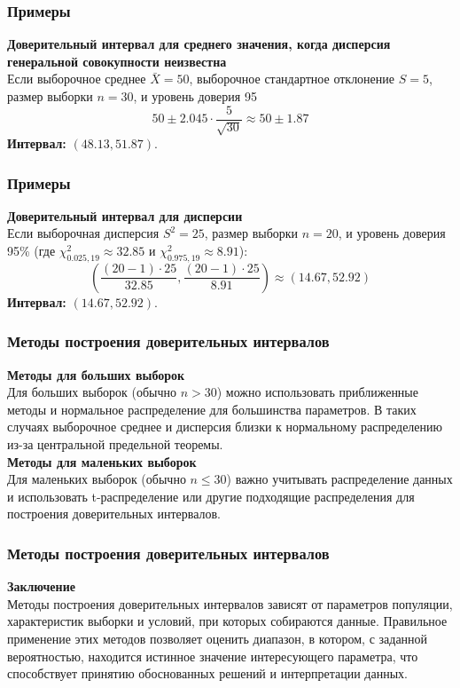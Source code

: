 \documentclass[aspectratio=169]{beamer}
\begin{document}
\begin{frame}
\frametitle{Примеры}
{\bf Доверительный интервал для среднего значения, когда дисперсия генеральной совокупности неизвестна}\\
Если выборочное среднее \( \bar{X} = 50 \), выборочное стандартное отклонение \( S = 5 \), размер выборки \( n = 30 \), и уровень доверия 95%
  \[
  50 \pm 2.045 \cdot \frac{5}{\sqrt{30}} \approx 50 \pm 1.87
  \]
{\bf Интервал:} \( (48.13, 51.87) \).
\end{frame}

\begin{frame}
\frametitle{Примеры}
{\bf Доверительный интервал для дисперсии}\\
Если выборочная дисперсия \( S^2 = 25 \), размер выборки \( n = 20 \), и уровень доверия 95\% (где \( \chi^2_{0.025, 19} \approx 32.85 \) и \( \chi^2_{0.975, 19} \approx 8.91 \)):
  \[
  \left( \frac{(20-1) \cdot 25}{32.85}, \frac{(20-1) \cdot 25}{8.91} \right) \approx (14.67, 52.92)
  \]
{\bf Интервал:} \( (14.67, 52.92) \).
\end{frame}

\begin{frame}
\frametitle{Методы построения доверительных интервалов}
{\bf Методы для больших выборок}\\
Для больших выборок (обычно \( n > 30 \)) можно использовать приближенные методы и нормальное распределение для большинства параметров. В таких случаях выборочное среднее и дисперсия близки к нормальному распределению из-за центральной предельной теоремы.\\
{\bf Методы для маленьких выборок}\\
Для маленьких выборок (обычно \( n \leq 30 \)) важно учитывать распределение данных и использовать t-распределение или другие подходящие распределения для построения доверительных интервалов.
\end{frame}

\begin{frame}
\frametitle{Методы построения доверительных интервалов}
{\bf Заключение}\\
Методы построения доверительных интервалов зависят от параметров популяции, характеристик выборки и условий, при которых собираются данные. Правильное применение этих методов позволяет оценить диапазон, в котором, с заданной вероятностью, находится истинное значение интересующего параметра, что способствует принятию обоснованных решений и интерпретации данных.
\end{frame}
\end{document}
